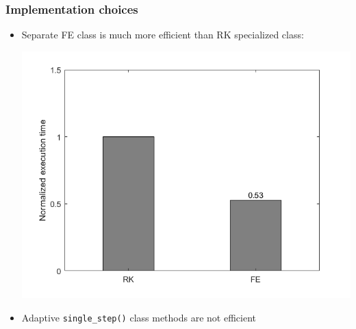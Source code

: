 \documentclass{beamer}
\begin{document}
\begin{frame} %
	\frametitle{Implementation choices}
	\begin{itemize}
		\item Separate FE class is much more efficient than RK specialized class:
		\begin{center}
			\includegraphics[scale=0.3]{etc/FE_vs_RK.jpeg}
		\end{center}	
		\item Adaptive \texttt{single\_step()} class methods are not efficient
	\end{itemize}
\end{frame}
\end{document}
